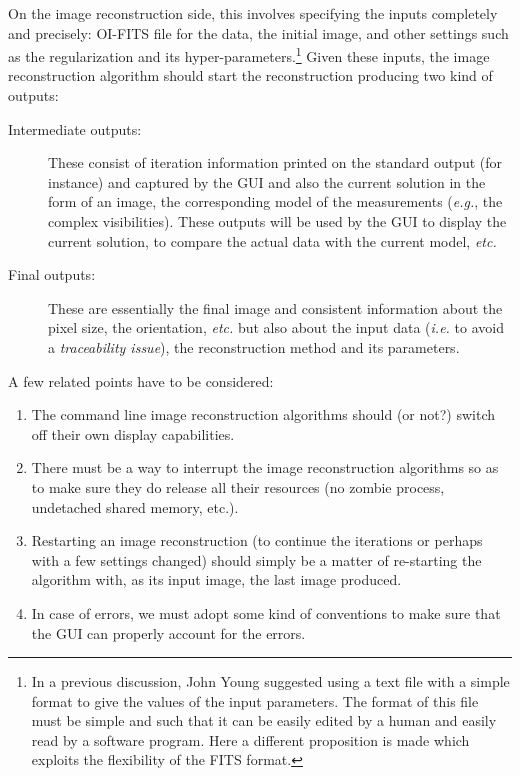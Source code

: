 \documentclass{article}
\begin{document}
On the image reconstruction side, this involves specifying the inputs
completely and precisely: OI-FITS file for the data, the initial
image, and other settings such as the regularization and its
hyper-parameters.\footnote{In a previous discussion, John Young
  suggested using a text file with a simple format to give the values
  of the input parameters. The format of this file must be simple and
  such that it can be easily edited by a human and easily read by a
  software program.  Here a different proposition is made which
  exploits the flexibility of the FITS format.} Given these inputs,
the image reconstruction algorithm should start the reconstruction
producing two kind of outputs:
\begin{description}
  \item[Intermediate outputs:]  These consist of iteration information
  printed on the standard output (for instance)  and captured by the GUI and
  also the current solution in the form of an image, the corresponding model
  of the measurements (\emph{e.g.}, the complex visibilities).  These outputs
  will be used by the GUI to display the current solution, to compare the
  actual data with the current model, \emph{etc.}

  \item[Final outputs:]  These are essentially the final image and consistent
  information about the pixel size, the orientation, \emph{etc.} but also
  about the input data (\emph{i.e.} to avoid a \emph{traceability issue}), the
  reconstruction method and its parameters.
\end{description}

A few related points have to be considered:
\begin{enumerate}
  \item The command line image reconstruction algorithms should (or not?)
  switch off their own display capabilities.

  \item There must be a way to interrupt the image reconstruction algorithms
  so as to make sure they do release all their resources (no zombie process,
  undetached shared memory, etc.).

  \item Restarting an image reconstruction (to continue the iterations
    or perhaps with a few settings changed) should simply be a matter
    of re-starting the algorithm with, as its input image, the last
    image produced.

  \item  In case of errors, we must adopt some kind of conventions to make
  sure that the GUI can properly account for the errors.
\end{enumerate}
\end{document}
